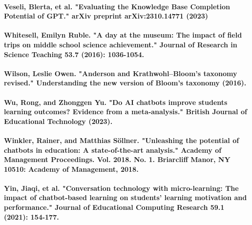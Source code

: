 \documentclass{article}
\begin{document}
\paragraph{Veseli, Blerta, et al. "Evaluating the Knowledge Base Completion Potential of GPT." arXiv preprint arXiv:2310.14771 (2023)}
\paragraph{Whitesell, Emilyn Ruble. "A day at the museum: The impact of field trips on middle school science achievement." Journal of Research in Science Teaching 53.7 (2016): 1036-1054. }
\paragraph{Wilson, Leslie Owen. "Anderson and Krathwohl–Bloom’s taxonomy revised." Understanding the new version of Bloom's taxonomy (2016). }
\paragraph{Wu, Rong, and Zhonggen Yu. "Do AI chatbots improve students learning outcomes? Evidence from a meta‐analysis." British Journal of Educational Technology (2023).}
\paragraph{Winkler, Rainer, and Matthias Söllner. "Unleashing the potential of chatbots in education: A state-of-the-art analysis." Academy of Management Proceedings. Vol. 2018. No. 1. Briarcliff Manor, NY 10510: Academy of Management, 2018.}
\paragraph{Yin, Jiaqi, et al. "Conversation technology with micro-learning: The impact of chatbot-based learning on students’ learning motivation and performance." Journal of Educational Computing Research 59.1 (2021): 154-177.}
\end{document}
